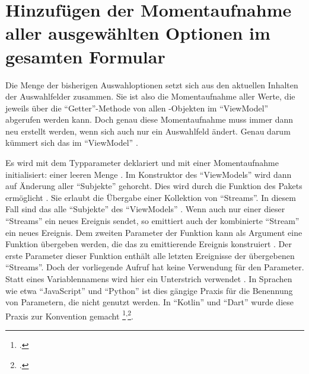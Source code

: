 \section{Hinzufügen der Momentaufnahme aller ausgewählten Optionen im gesamten Formular}

Die Menge der bisherigen Auswahloptionen setzt sich aus den aktuellen Inhalten der Auswahlfelder zusammen.
Sie ist also die Momentaufnahme aller Werte,
die jeweils über die \enquote{Getter}-Methode  von allen -Objekten im \enquote{ViewModel} abgerufen werden kann.
Doch genau diese Momentaufnahme muss immer dann neu erstellt werden,
wenn sich auch nur ein Auswahlfeld ändert.
Genau darum kümmert sich das   im \enquote{ViewModel} \Lst{\ref{lst:Schritt4priorChoices}}.



Es wird mit dem Typparameter  deklariert  und mit einer Momentaufnahme initialisiert: einer leeren Menge \IC{{}} .
Im Konstruktor des \enquote{ViewModels} wird dann auf Änderung aller \enquote{Subjekte} gehorcht.
Dies wird durch die Funktion  des Pakets  ermöglicht .
Sie erlaubt die Übergabe einer Kollektion von \enquote{Streams}.
In diesem Fall sind das alle \enquote{Subjekte} des \enquote{ViewModels} .
Wenn auch nur einer dieser \enquote{Streams} ein neues Ereignis sendet,
so emittiert auch der kombinierte \enquote{Stream} ein neues Ereignis.
Dem zweiten Parameter der Funktion  kann als Argument eine Funktion übergeben werden,
die das zu emittierende Ereignis konstruiert .
Der erste Parameter dieser Funktion enthält alle letzten Ereignisse der übergebenen \enquote{Streams}.
Doch der vorliegende Aufruf hat keine Verwendung für den Parameter.
Statt eines Variablennamens wird hier ein Unterstrich \IC{_} verwendet .
In Sprachen wie etwa \enquote{JavaScript} und \enquote{Python} ist dies gängige Praxis für die Benennung von Parametern,
die nicht genutzt werden.
In \enquote{Kotlin} und \enquote{Dart} wurde diese Praxis zur Konvention gemacht
\footcite[Vgl.][]{DartEffectiveDartStylePREFERusingUnderscore}\textsuperscript{,}\footcite[Vgl.][]{KotlinHighOrderFunctionsAndLambdasUnderscoreForUnusedVariables}.

